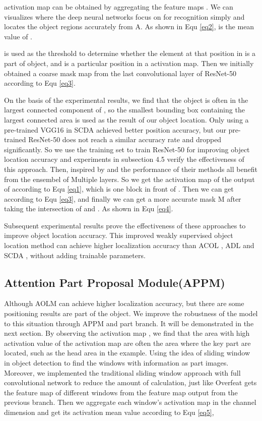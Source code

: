 \documentclass[runningheads]{llncs}
\begin{document}
activation map  can be obtained by aggregating the feature maps . We can visualizes where the deep neural networks focus on for recognition simply and locates the object regions accurately from A. As shown in Equ \ref{eq2},  is the mean value of .

 is used as the threshold to determine whether the element at that position in  is a part of object, and  is a particular position in a  activation map. Then we initially obtained a coarse mask map  from the last convolutional layer   of ResNet-50 \cite{he2016deep} according to Equ \ref{eq3}.

On the basis of the experimental results, we find that the object is often in the largest connected component of , so the smallest bounding box containing the largest connected area is used as the result of our object location. Only using a pre-trained VGG16 \cite{simonyan2014very} in SCDA \cite{wei2017selective} achieved better position accuracy, but our pre-trained ResNet-50 does not reach a similar accuracy rate and dropped significantly. So we use the training set to train ResNet-50 for improving object location accuracy and experiments in subsection 4.5 verify the effectiveness of this approach. Then, inspired by \cite{wei2017selective} and \cite{long2015fully} the performance of their methods all benefit from the ensembel of Multiple layers. So we get the activation map of the output of  according to Equ \ref{eq1}, which is one block in front of . Then we can get  according to Equ \ref{eq3}, and finally we can get a more accurate mask M after taking the intersection of  and . As shown in Equ \ref{eq4}.

Subsequent experimental results prove the effectiveness of these approaches to improve object location accuracy. This improved weakly supervised object location method can achieve higher localization accuracy than ACOL \cite{zhang2018adversarial}, ADL \cite{choe2019attention} and SCDA \cite{wei2017selective}, without adding trainable parameters.
\subsection{Attention Part Proposal Module(APPM)}
Although AOLM can achieve higher localization accuracy, but there are some positioning results are part of the object. We improve the robustness of the model to this situation through APPM and part branch. It will be demonstrated in the next section. By observing the activation map , we find that the area with high activation value of the activation map are often the area where the key part are located, such as the head area in the example. Using the idea of sliding window in object detection to find the windows with information as part images. Moreover, we implemented the traditional sliding window approach with full convolutional network to reduce the amount of calculation, just like Overfeat \cite{sermanet2013overfeat} gets the feature map of different windows from the feature map output from the previous branch. Then we aggregate each window's activation map  in the channel dimension and get its activation mean value  according to Equ \ref{eq5}, 
\end{document}
